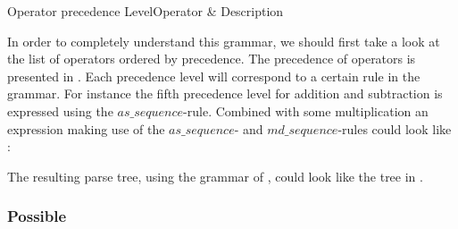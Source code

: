          {Operator precedence}
  {Level}{Operator & Description}{
}

In order to completely understand this grammar, we should first take a look at the list of
operators ordered by precedence. The precedence of operators is presented in
. Each precedence level will correspond to a certain rule
in the grammar. For instance the fifth precedence level for addition and subtraction is expressed
using the $as\_sequence$-rule. Combined with some multiplication an expression making use of
the $as\_sequence$- and $md\_sequence$-rules could look like :


The resulting parse tree, using the grammar of \productname{}, could look like the tree
in .



\subsubsection{Possible }



